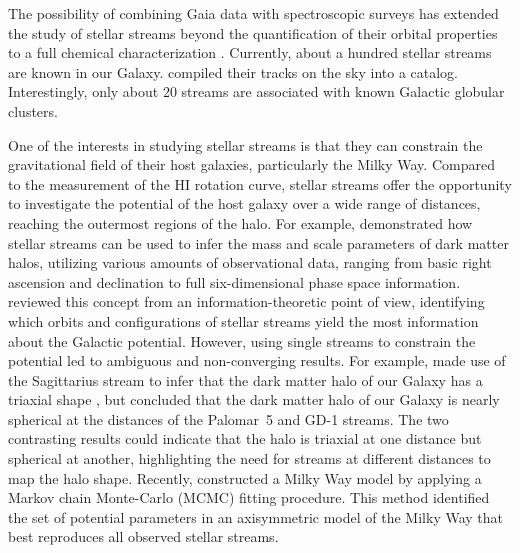 \documentclass{aa}
\begin{document}
  The possibility of combining Gaia data with spectroscopic surveys has extended the study of stellar streams beyond the quantification of their orbital properties to a full chemical characterization \citep{2019MNRAS.490.3508L, 2020AJ....160..181J, 2021ApJ...911..149L, 2022ApJ...928...30L, 2024MNRAS.529.2413U}. Currently, about a hundred stellar streams are known in our Galaxy. \citet{2023MNRAS.520.5225M} compiled their tracks on the sky into a catalog. Interestingly, only about 20 streams are associated with known Galactic globular clusters.

  One of the interests in studying stellar streams is that they can constrain the gravitational field of their host galaxies, particularly the Milky Way. Compared to the measurement of the HI rotation curve, stellar streams offer the opportunity to investigate the potential of the host galaxy over a wide range of distances, reaching the outermost regions of the halo. For example, \citet{2011MNRAS.417..198V} demonstrated how stellar streams can be used to infer the mass and scale parameters of dark matter halos, utilizing various amounts of observational data, ranging from basic right ascension and declination to full six-dimensional phase space information. \citet{2018ApJ...867..101B} reviewed this concept from an information-theoretic point of view, identifying which orbits and configurations of stellar streams yield the most information about the Galactic potential. However, using single streams to constrain the potential led to ambiguous and non-converging results. For example, \citet{2010ApJ...718.1128L} made use of the Sagittarius stream to infer that the dark matter halo of our Galaxy has a triaxial shape \citep[see also][]{2004MNRAS.351..643H, 2005ApJ...619..800J, 2005ApJ...619..807L}, but \citet{2016ApJ...833...31B} concluded that the dark matter halo of our Galaxy is nearly spherical at the distances of the Palomar~5 and GD-1 streams. The two contrasting results could indicate that the halo is triaxial at one distance but spherical at another, highlighting the need for streams at different distances to map the halo shape. Recently, \citet{2024ApJ...967...89I} constructed a Milky Way model by applying a Markov chain Monte-Carlo (MCMC) fitting procedure. This method identified the set of potential parameters in an axisymmetric model of the Milky Way that best reproduces all observed stellar streams.
  
\end{document}
